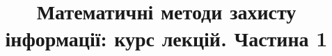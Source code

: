 

\title{Математичні методи захисту інформації: курс лекцій. Частина 1}

\makeindex


\maketitle






















\printindex
\tableofcontents

